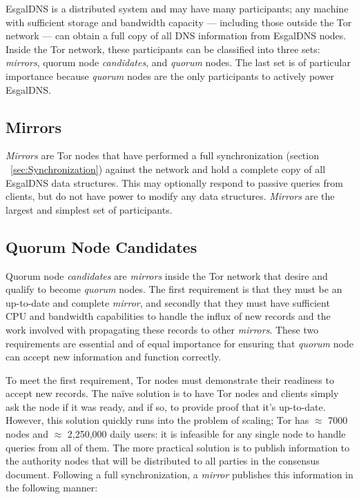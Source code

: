 EsgalDNS is a distributed system and may have many participants; any machine with sufficient storage and bandwidth capacity --- including those outside the Tor network --- can obtain a full copy of all DNS information from EsgalDNS nodes. Inside the Tor network, these participants can be classified into three sets: \emph{mirrors}, quorum node \emph{candidates}, and \emph{quorum} nodes. The last set is of particular importance because \emph{quorum} nodes are the only participants to actively power EsgalDNS.

\subsection{Mirrors}

\emph{Mirrors} are Tor nodes that have performed a full synchronization (section ~\ref{sec:Synchronization}) against the network and hold a complete copy of all EsgalDNS data structures. This may optionally respond to passive queries from clients, but do not have power to modify any data structures. \emph{Mirrors} are the largest and simplest set of participants.

\subsection{Quorum Node Candidates}

Quorum node \emph{candidates} are \emph{mirrors} inside the Tor network that desire and qualify to become \emph{quorum} nodes. The first requirement is that they must be an up-to-date and complete \emph{mirror}, and secondly that they must have sufficient CPU and bandwidth capabilities to handle the influx of new records and the work involved with propagating these records to other \emph{mirrors}. These two requirements are essential and of equal importance for ensuring that \emph{quorum} node can accept new information and function correctly.

To meet the first requirement, Tor nodes must demonstrate their readiness to accept new records. The na\"{i}ve solution is to have Tor nodes and clients simply ask the node if it was ready, and if so, to provide proof that it's up-to-date. However, this solution quickly runs into the problem of scaling; Tor has $ \approx $ 7000 nodes and $ \approx $ 2,250,000 daily users\cite{TorMetrics}: it is infeasible for any single node to handle queries from all of them. The more practical solution is to publish information to the authority nodes that will be distributed to all parties in the consensus document. Following a full synchronization, a \emph{mirror} publishes this information in the following manner:

